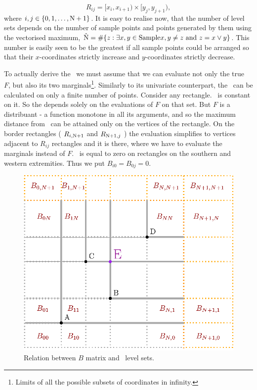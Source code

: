 \documentclass{book}
\begin{document}
$$R_{ij} = [x_i, x_{i+1})\times[y_j, y_{j+1}),$$ 
where $i,j \in \{0, 1, \dots, \mathrm{N}+1 \}$. It is easy to realise now, that the number of level sets depends on the number of sample points and points generated by them using the vectorised maximum, $\hat{\mathrm{N}} = \# \{ z : \exists x,y \in \text{Sample} x,y \not=z \text{ and } z = x \vee y \}$. This number is easily seen to be the greatest if all sample points could be arranged so that their $x$-coordinates strictly increase and $y$-coordinates strictly decrease.  

To actually derive the \KS\, we must assume that we can evaluate not only the true \cdf\, $F$, but also its two marginals\footnote{Limits of all the possible subsets of coordinates in infinity.}. Similarly to its univariate counterpart, the \KS\, can be calculated on only a finite number of points. Consider any rectangle. \Fecdf\, is constant on it. So the \KS depends solely on the evaluations of $F$ on that set. But $F$ is a distribuant - a function monotone in all its arguments, and so the maximum distance from \Fecdf\, can be attained only on the vertices of the rectangle. On the border rectangles ( $R_{i,\mathrm{N}+1}$ and $R_{\mathrm{N}+1,j}$ ) the evaluation simplifies to vertices adjacent to $R_{ij}$ rectangles and it is there, where we have to evaluate the marginals instead of $F$. \Fecdf\, is equal to zero on rectangles on the southern and western extremities. Thus we put $B_{i0} = B_{0j} = 0$. 

\begin{figure}
	\centering \includegraphics[scale=1]{./img/KS2.eps}
	\caption{Relation between $B$ matrix and \ecdf\, level sets.}\label{spaceDivision}
\end{figure}
\end{document}
